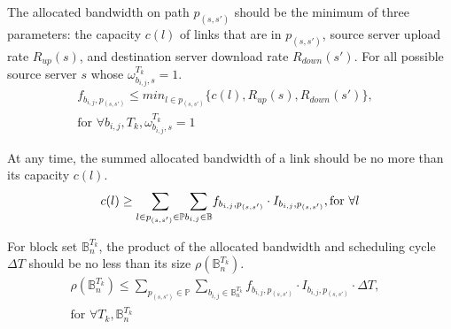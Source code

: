 \begin{packeditemize}

\item The allocated bandwidth on path $p_{(s,s')}$ should be the minimum of three parameters: the capacity $c(l)$ of links that are in $p_{(s,s')}$, source server upload rate $R_{up}(s)$, and destination server download rate $R_{down}(s')$. For all possible source server $s$ whose $\omega^{T_k}_{b_{i,j},s}=1$.
\begin{equation}
\begin{split}
f_{b_{i,j},p_{(s,s')}} \leq  \displaystyle{min_{l\in p_{(s,s')}}} \{c(l),R_{up}(s),R_{down}(s')\},& \\
\text{for }\forall b_{i,j}, T_k, \omega^{T_k}_{b_{i,j},s}=1 &%
\end{split}
\end{equation}


\item At any time, the summed allocated bandwidth of a link should be no more than its capacity $c(l)$.
\begin{equation}
c(l) \geq  \displaystyle{\sum_{l\in p_{(s,s')}\in \mathbb{P}}} \displaystyle{\sum_{b_{i,j} \in \mathbb{B}}} f_{b_{i,j},p_{(s,s')}} \cdot I_{b_{i,j},p_{(s,s')}}, \text{for }\forall l\\
\end{equation}

\item For block set $\mathbb{B}^{T_k}_n$, the product of the allocated bandwidth and scheduling cycle $\Delta T$ should be no less than its size $\rho(\mathbb{B}^{T_k}_n)$.
\begin{equation}
\begin{split}
\rho(\mathbb{B}^{T_k}_n) \leq \displaystyle{\sum_{p_{(s,s')}\in \mathbb{P}}} \displaystyle{\sum_{b_{i,j} \in \mathbb{B}^{T_k}_n}} f_{b_{i,j},p_{(s,s')}} \cdot I_{b_{i,j},p_{(s,s')}} \cdot \Delta T,& \\
\text{for }\forall T_k, \mathbb{B}^{T_k}_n &
\end{split}
\end{equation}



\end{packeditemize}
